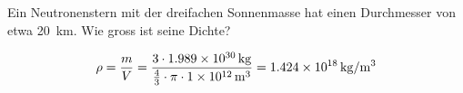 
\begin{aufgabe}
Ein Neutronenstern mit der dreifachen Sonnenmasse hat einen Durchmesser von etwa \SI{20}{km}. Wie gross ist
seine Dichte?

\begin{loesung}
	\[\rho=\frac{m}{V}=\frac{3\cdot \SI{1.989E30}{kg}}{\frac{4}{3}\cdot \pi\cdot\SI{1E12}{m^3}} = \SI{1.424e+18}{kg/m^3}\]
\end{loesung}
\end{aufgabe}
